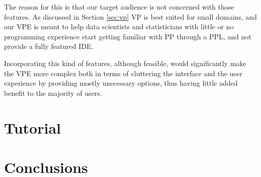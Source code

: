 The reason for this is that our target audience is not concerned with those features.
As discussed in Section \ref{sec:vp} VP is best suited for small domains, and our
VPE is meant to help data scientists and statisticians with little or no programming
experience start getting familiar with PP through a PPL, and not provide a
fully featured IDE.

Incorporating this kind of features, although feasible, would significantly
make the VPE more complex both in terms of cluttering the interface and the user
experience by providing mostly unecessary options, thus having little added
benefit to the majority of users.

\section{Tutorial}

\section{Conclusions}
